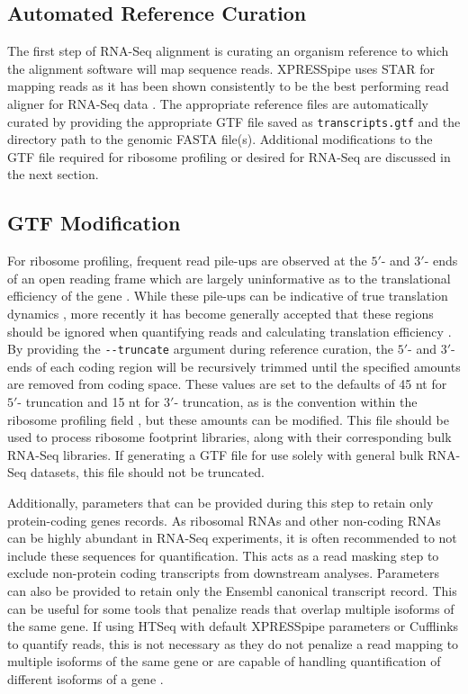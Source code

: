 \documentclass[10pt, oneside]{article}
\begin{document}
\subsection*{Automated Reference Curation}
The first step of RNA-Seq alignment is curating an organism reference to which the alignment software will map sequence reads. XPRESSpipe uses STAR \cite{star} for mapping reads as it has been shown consistently to be the best performing read aligner for RNA-Seq data \cite{alignment_benchmark}. The appropriate reference files are automatically curated by providing the appropriate GTF file saved as \texttt{transcripts.gtf} and the directory path to the genomic FASTA file(s). Additional modifications to the GTF file required for ribosome profiling or desired for RNA-Seq are discussed in the next section.\\

\subsection*{GTF Modification}
For ribosome profiling, frequent read pile-ups are observed at the $5'$- and $3'$- ends of an open reading frame which are largely uninformative as to the translational efficiency of the gene \cite{gerashchenko_nar}. While these pile-ups can be indicative of true translation dynamics \cite{tuller_alt}, more recently it has become generally accepted that these regions should be ignored when quantifying reads and calculating translation efficiency \cite{ingolia_meth, weinberg_reports}. By providing the \texttt{-{}-truncate} argument during reference curation, the $5'$- and $3'$- ends of each coding region will be recursively trimmed until the specified amounts are removed from coding space. These values are set to the defaults of 45 nt for $5'$- truncation and 15 nt for $3'$- truncation, as is the convention within the ribosome profiling field \cite{ingolia_meth}, but these amounts can be modified. This file should be used to process ribosome footprint libraries, along with their corresponding bulk RNA-Seq libraries. If generating a GTF file for use solely with general bulk RNA-Seq datasets, this file should not be truncated. \par

Additionally, parameters that can be provided during this step to retain only protein-coding genes records. As ribosomal RNAs and other non-coding RNAs can be highly abundant in RNA-Seq experiments, it is often recommended to not include these sequences for quantification. This acts as a read masking step to exclude non-protein coding transcripts from downstream analyses. Parameters can also be provided to retain only the Ensembl canonical transcript record. This can be useful for some tools that penalize reads that overlap multiple isoforms of the same gene. If using HTSeq with default XPRESSpipe parameters or Cufflinks to quantify reads, this is not necessary as they do not penalize a read mapping to multiple isoforms of the same gene or are capable of handling quantification of different isoforms of a gene \cite{htseq, cufflinks}.\\
\end{document}
